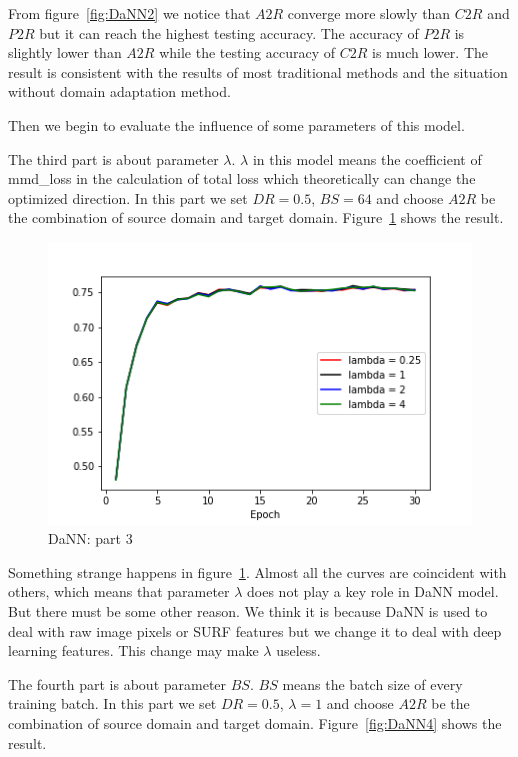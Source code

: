 \documentclass[conference]{IEEEtran}
\begin{document}
From figure~\ref{fig:DaNN2} we notice that $A2R$ converge more slowly than $C2R$ and $P2R$ but it can reach the highest testing accuracy. The accuracy of $P2R$ is slightly lower than $A2R$ while the testing accuracy of $C2R$ is much lower. The result is consistent with the results of most traditional methods and the situation without domain adaptation method.

Then we begin to evaluate the influence of some parameters of this model.

The third part is about parameter $\lambda$. $\lambda$ in this model means the coefficient of mmd\_loss in the calculation of total loss which theoretically can change the optimized direction. In this part we set $DR = 0.5$, $BS = 64$ and choose $A2R$ be the combination of source domain and target domain. Figure~\ref{fig:DaNN3} shows the result.
\begin{figure}[!h]
    \centerline{\includegraphics[scale=0.4]{HDaNN/DaNN_fig3.png}}
    \caption{DaNN: part 3}
    \label{fig:DaNN3}
\end{figure}

Something strange happens in figure~\ref{fig:DaNN3}. Almost all the curves are coincident with others, which means that parameter $\lambda$ does not play a key role in DaNN model. But there must be some other reason. We think it is because DaNN is used to deal with raw image pixels or SURF features but we change it to deal with deep learning features. This change may make $\lambda$ useless.

The fourth part is about parameter $BS$. $BS$ means the batch size of every training batch. In this part we set $DR = 0.5$, $\lambda = 1$ and choose $A2R$ be the combination of source domain and target domain. Figure~\ref{fig:DaNN4} shows the result.
\end{document}
